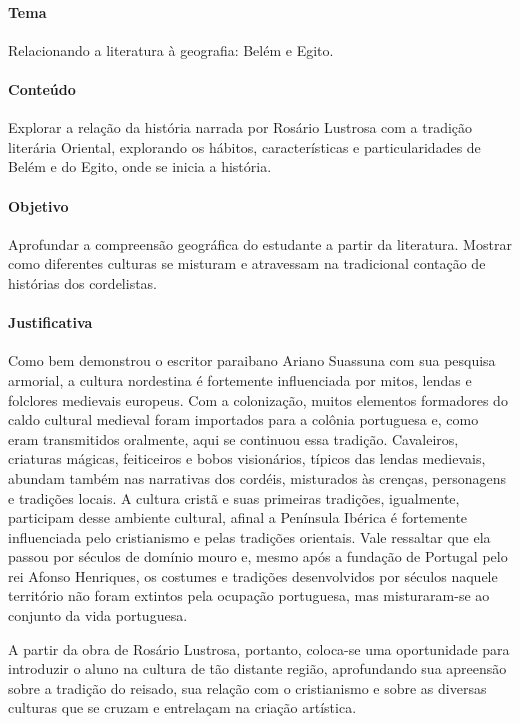 \documentclass[11pt]{extarticle}
\begin{document}

\paragraph{Tema} Relacionando a literatura à geografia: Belém e Egito.

\paragraph{Conteúdo} Explorar a relação da história narrada por Rosário Lustrosa com a tradição literária Oriental, explorando os hábitos, características e particularidades de Belém e do Egito, onde se inicia a história.

\paragraph{Objetivo} Aprofundar a compreensão geográfica do estudante a partir da literatura. Mostrar como diferentes culturas se misturam e atravessam na tradicional contação de histórias dos cordelistas. 

\paragraph{Justificativa} Como bem demonstrou o escritor paraibano Ariano Suassuna com sua pesquisa armorial, a cultura nordestina é fortemente influenciada por mitos, lendas e folclores medievais europeus. Com a colonização, muitos elementos formadores do caldo cultural medieval foram importados para a colônia portuguesa e, como eram transmitidos oralmente, aqui se continuou essa tradição. Cavaleiros, criaturas mágicas, feiticeiros e bobos visionários, típicos das lendas medievais, abundam também nas narrativas dos cordéis, misturados às crenças, personagens e tradições locais. A cultura cristã e suas primeiras tradições, igualmente, participam desse ambiente cultural, afinal a Península Ibérica é fortemente influenciada pelo cristianismo e pelas tradições orientais. Vale ressaltar que ela passou por séculos de domínio mouro e, mesmo após a fundação de Portugal pelo rei Afonso Henriques, os costumes e tradições desenvolvidos por séculos naquele território não foram extintos pela ocupação portuguesa, mas misturaram-se ao conjunto da vida portuguesa.

A partir da obra de Rosário Lustrosa, portanto, coloca-se uma oportunidade para introduzir o aluno na cultura de tão distante região, aprofundando sua apreensão sobre a tradição do reisado, sua relação com o cristianismo e sobre as diversas culturas que se cruzam e entrelaçam na criação artística.
\end{document}
